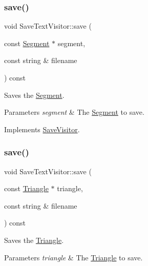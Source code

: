 \hypertarget{class_save_text_visitor_aded2d7fe5898a3fd55bf4d15ed405416}{}\label{class_save_text_visitor_aded2d7fe5898a3fd55bf4d15ed405416} 
\subsubsection{\texorpdfstring{save()}{save()}\hspace{0.1cm}{\footnotesize\ttfamily [2/5]}}
{\footnotesize\ttfamily void Save\+Text\+Visitor\+::save (\begin{DoxyParamCaption}\item[{const \hyperlink{class_segment}{Segment} $\ast$}]{segment,  }\item[{const string \&}]{filename }\end{DoxyParamCaption}) const\hspace{0.3cm}{\ttfamily [virtual]}}

Saves the \hyperlink{class_segment}{Segment}. 
\begin{DoxyParams}{Parameters}
{\em segment} & The \hyperlink{class_segment}{Segment} to save. \\
\hline
\end{DoxyParams}


Implements \hyperlink{class_save_visitor_ad23764257a2a9836cb920be85ecbcd64}{Save\+Visitor}.

\hypertarget{class_save_text_visitor_a1ac892a59b374572d44fc69b9b3528c0}{}\label{class_save_text_visitor_a1ac892a59b374572d44fc69b9b3528c0} 
\subsubsection{\texorpdfstring{save()}{save()}\hspace{0.1cm}{\footnotesize\ttfamily [3/5]}}
{\footnotesize\ttfamily void Save\+Text\+Visitor\+::save (\begin{DoxyParamCaption}\item[{const \hyperlink{class_triangle}{Triangle} $\ast$}]{triangle,  }\item[{const string \&}]{filename }\end{DoxyParamCaption}) const\hspace{0.3cm}{\ttfamily [virtual]}}

Saves the \hyperlink{class_triangle}{Triangle}. 
\begin{DoxyParams}{Parameters}
{\em triangle} & The \hyperlink{class_triangle}{Triangle} to save. \\
\hline
\end{DoxyParams}


